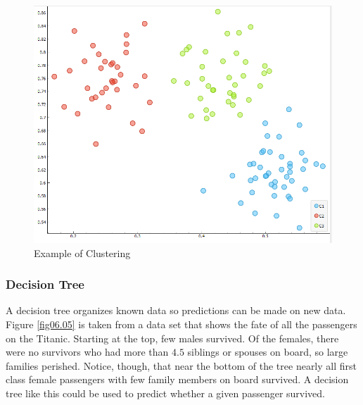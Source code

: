 \begin{figure}[H]
	\centering
	\includegraphics[width=\maxwidth{.95\linewidth}]{gfx/06-Cluster}
	\caption{Example of Clustering}
	\label{fig06.11}
\end{figure}

\subsubsection{Decision Tree}

A decision tree organizes known data so predictions can be made on new data. Figure \ref{fig06.05} is taken from a data set that shows the fate of all the passengers on the Titanic. Starting at the top, few males survived. Of the females, there were no survivors who had more than $ 4.5 $ siblings or spouses on board, so large families perished. Notice, though, that near the bottom of the tree nearly all first class female passengers with few family members on board survived. A decision tree like this could be used to predict whether a given passenger survived. 

